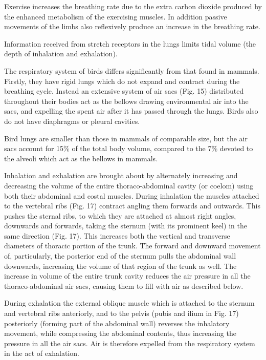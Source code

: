 Exercise increases the breathing rate due to the extra carbon dioxide produced by the enhanced metabolism of the exercising muscles. In addition passive movements of the limbs also reflexively produce an increase in the breathing rate.

Information received from stretch receptors in the lungs limits tidal volume (the depth of inhalation and exhalation).

The respiratory system of birds differs significantly from that found in mammals. Firstly, they have rigid lungs which do not expand and contract during the breathing cycle. Instead an extensive system of air sacs (Fig. 15) distributed throughout their bodies act as the bellows drawing environmental air into the sacs, and expelling the spent air after it has passed through the lungs. Birds also do not have diaphragms or pleural cavities.

Bird lungs are smaller than those in mammals of comparable size, but the air sacs account for 15\% of the total body volume, compared to the 7\% devoted to the alveoli which act as the bellows in mammals.

Inhalation and exhalation are brought about by alternately increasing and decreasing the volume of the entire thoraco-abdominal cavity (or coelom) using both their abdominal and costal muscles. During inhalation the muscles attached to the vertebral ribs (Fig. 17) contract angling them forwards and outwards. This pushes the sternal ribs, to which they are attached at almost right angles, downwards and forwards, taking the sternum (with its prominent keel) in the same direction (Fig. 17). This increases both the vertical and transverse diameters of thoracic portion of the trunk. The forward and downward movement of, particularly, the posterior end of the sternum pulls the abdominal wall downwards, increasing the volume of that region of the trunk as well. The increase in volume of the entire trunk cavity reduces the air pressure in all the thoraco-abdominal air sacs, causing them to fill with air as described below.

During exhalation the external oblique muscle which is attached to the sternum and vertebral ribs anteriorly, and to the pelvis (pubis and ilium in Fig. 17) posteriorly (forming part of the abdominal wall) reverses the inhalatory movement, while compressing the abdominal contents, thus increasing the pressure in all the air sacs. Air is therefore expelled from the respiratory system in the act of exhalation.

